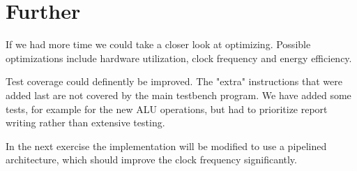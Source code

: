 \section{Further}
If we had more time we could take a closer look at optimizing.
Possible optimizations include hardware utilization, clock frequency and energy efficiency.

Test coverage could definently be improved.
The "extra" instructions that were added last are not covered by the main testbench program.
We have added some tests, for example for the new ALU operations,
but had to prioritize report writing rather than extensive testing.

In the next exercise the implementation will be modified to use a pipelined architecture,
which should improve the clock frequency significantly.

